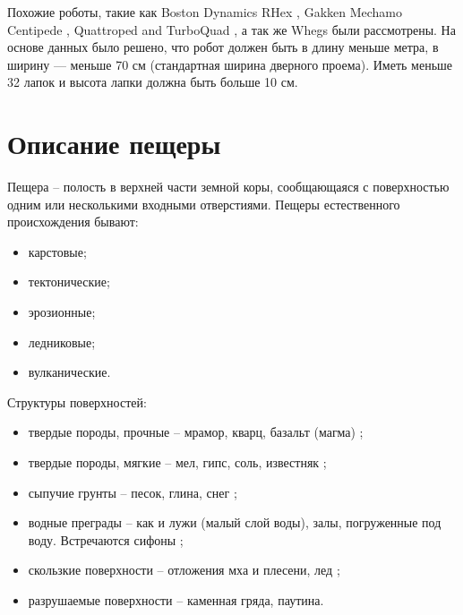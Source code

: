Похожие роботы, такие как Boston Dynamics RHex \cite{altendorfer2001rhex}, Gakken Mechamo Centipede \cite{miller2008extreme}, Quattroped and TurboQuad \cite{chen2014quattroped,chen2017turboquad}, а так же Whegs \cite{schroer2004comparing} были рассмотрены. На основе данных было решено, что робот должен быть в длину меньше метра, в ширину --- меньше 70 см (стандартная ширина дверного проема). Иметь меньше 32 лапок и высота лапки должна быть больше 10 см.



\section{Описание пещеры}
Пещера -- полость в верхней части земной коры, сообщающаяся с поверхностью одним или несколькими входными отверстиями. Пещеры естественного происхождения бывают:
\begin{itemize}
    \item карстовые; 
    \item тектонические;
    \item эрозионные;
    \item ледниковые;
    \item вулканические.
\end{itemize}

Структуры поверхностей:
\begin{itemize}
    \item твердые породы, прочные -- мрамор, кварц, базальт (магма) ;
    \item твердые породы, мягкие -- мел, гипс, соль, известняк ;
    \item сыпучие грунты -- песок, глина, снег ;
    \item водные преграды -- как и лужи (малый слой воды), залы, погруженные под воду. Встречаются сифоны ;
    \item скользкие поверхности -- отложения мха и плесени, лед ;
    \item разрушаемые поверхности -- каменная гряда, паутина.
\end{itemize}


